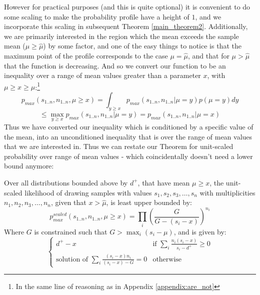 \documentclass[12pt]{colt2020} %
\begin{document}
However for practical purposes (and this is quite optional) it is convenient to do some scaling to make the probability profile have a height of $1$, and we incorporate this scaling in subsequent Theorem \ref{main_theorem2}.
Additionally, we are primarily interested in the region which the mean exceeds the sample mean ($\mu\ge \hat{\mu}$) by some factor, and one of the easy things to notice is that the maximum point of the profile corresponds to the case $\mu=\hat{\mu}$,
 and that for $\mu>\hat{\mu}$ that the function is decreasing.
And so we convert our function to be an inequality over a range of mean values greater than a parameter $x$, with $\mu\ge x\ge \hat{\mu}$:\footnote{In the same line of reasoning as in Appendix \ref{appendix:are_not}}
$$p_{max}(s_{1..n},n_{1..n},\mu\ge x) = \int_{y\ge x} p_{max}(s_{1..n},n_{1..n}|\mu=y)p(\mu=y)dy $$
$$ \le \max_{y\ge x} p_{max}(s_{1..n},n_{1..n}|\mu=y) = p_{max}(s_{1..n},n_{1..n}|\mu=x)$$
Thus we have converted our inequality which is conditioned by a specific value of the mean, into an unconditioned inequality that is over the range of mean values that we are interested in.
Thus we can restate our Theorem for unit-scaled probability over range of mean values - which coincidentally doesn't need a lower bound anymore:

\begin{theorem}\label{main_theorem_m}
Over all distributions bounded above by $d^+$, that have mean $\mu\ge x$, the unit-scaled likelihood of drawing samples with values $s_1,s_2,s_3,\dots,s_n$ with multiplicities $n_1,n_2,n_3,\dots,n_n$, given that $x>\hat{\mu}$, is least upper bounded by:\\
\begin{equation}\label{main_theorem_m1}p_{max}^{scaled}(s_{1..n},n_{1..n},\mu\ge x) = \prod_i \left(\frac{G}{G-(s_i-x)}\right)^{n_i}\end{equation}
Where $G$ is constrained such that $G>\max_i (s_i-\mu)$, and is given by:
$$\left\{
	\begin{array}{ll}
		d^+-x &\mbox{if } \sum_i\frac{n_i(s_i-x)}{s_i-d^+} \ge 0 \\
		\mbox{solution of } \sum_i \frac{(s_i-x)n_i}{(s_i-x)-G} =0 &\mbox{otherwise}
	\end{array}
\right.$$
\end{theorem}
\end{document}
